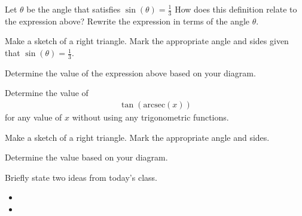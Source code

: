 \begin{problem}
  \begin{subproblem}
  \item Let $\theta$ be the angle that satisfies ${\displaystyle \sin\left(\theta\right)=\frac{1}{3}}$
    How does this definition relate to the expression above? Rewrite the expression in terms of the angle $\theta$.
    \vspace{3em}
  \item Make a sketch of a right triangle. Mark the appropriate angle
    and sides given that ${\displaystyle \sin\left(\theta\right)=\frac{1}{3}}$.
    \vfill
  \item Determine the value of the expression above based on your diagram.
    \vfill
    \vfill
  \end{subproblem}

  \clearpage

\item Determine the value of
  \begin{eqnarray*}
    \tan\left(\mathrm{arcsec}\left(x\right)\right)
  \end{eqnarray*}
  for any value of $x$ without using any trigonometric functions.

  \begin{subproblem}
  \item Make a sketch of a right triangle. Mark the appropriate angle
    and sides.
    \vfill
  \item Determine the value based on your diagram.
    \vfill
    \vfill
  \end{subproblem}

\end{problem}

\postClass

\begin{problem}
\item Briefly state two ideas from today's class.
  \begin{itemize}
  \item
  \item
  \end{itemize}
\item
  \begin{subproblem}
    \item
  \end{subproblem}
\end{problem}


